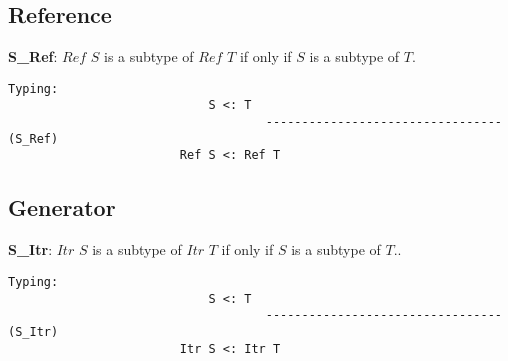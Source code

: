 \subsection{Reference}
\textbf{S_Ref}: $Ref$ $S$ is a subtype of $Ref$ $T$ if only if $S$ is a subtype of $T$. 
\begin{lstlisting}
Typing:
                            S <: T
									---------------------------------   (S_Ref)
                        Ref S <: Ref T
\end{lstlisting}

\subsection{Generator}
\textbf{S_Itr}: $Itr$ $S$ is a subtype of $Itr$ $T$ if only if $S$ is a subtype of $T$.. 
\begin{lstlisting}
Typing:
                            S <: T
									---------------------------------   (S_Itr)
                        Itr S <: Itr T
\end{lstlisting}